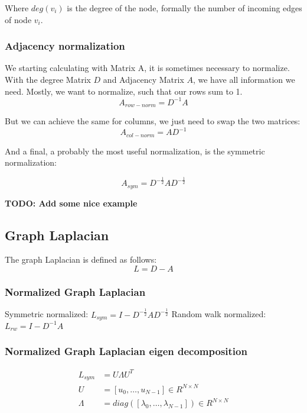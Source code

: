 Where $deg(v_i)$ is the degree of the node, formally the number of incoming edges of node $v_i$.

\subsubsection{Adjacency normalization}
We starting calculating with Matrix A, it is sometimes necessary to normalize.
With the degree Matrix $D$ and Adjacency Matrix $A$, we have all information we need.
Mostly, we want to normalize, such that our rows sum to 1.
\begin{equation}
    A_{row-norm} = D^{-1} A
\end{equation}

But we can achieve the same for columns, we just need to swap the two matrices:
\begin{equation}
    A_{col-norm} = A D^{-1}
\end{equation}

And a final, a probably the most useful normalization, is the symmetric normalization:

\begin{equation}
    A_{sym} =  D^{-\frac{1}{2}} A D^{-\frac{1}{2}}
\end{equation}

\textbf{TODO: Add some nice example}

\subsection{Graph Laplacian}
The graph Laplacian is defined as follows:
\begin{equation}
    L = D - A
\end{equation}


\subsubsection{Normalized Graph Laplacian}

Symmetric normalized: $L_{sym} = I - D^{-\frac{1}{2}} A D^{-\frac{1}{2}}$
Random walk normalized: $L_{rw} = I - D^{-1} A$

\subsubsection{Normalized Graph Laplacian eigen decomposition}

\begin{equation}
    \begin{aligned}
        L_{sym} &= U \Lambda U^T \\
        U &= [u_0, \dots, u_{N-1}] \in R^{N \times N}\\
        \Lambda &= diag \left ( [\lambda_0, \dots, \lambda_{N-1}]  \right ) \in R^{N \times N}
    \end{aligned}
\end{equation}

